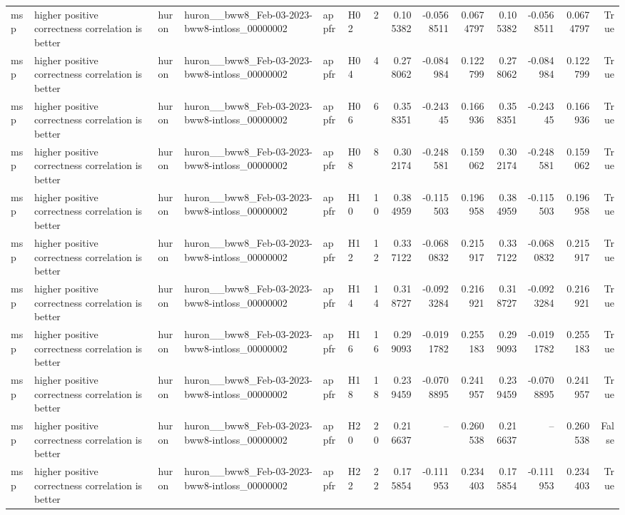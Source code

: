 \begin{longtable}{llllllrrrrrrrr}
msp & higher positive correctness correlation is better & huron & huron\_\_bww8\_Feb-03-2023-bww8-intloss\_00000002 & appfr & H02 & 2 & 0.105382 & -0.0568511 & 0.0674797 & 0.105382 & -0.0568511 & 0.0674797 & True \\
msp & higher positive correctness correlation is better & huron & huron\_\_bww8\_Feb-03-2023-bww8-intloss\_00000002 & appfr & H04 & 4 & 0.278062 & -0.084984 & 0.122799 & 0.278062 & -0.084984 & 0.122799 & True \\
msp & higher positive correctness correlation is better & huron & huron\_\_bww8\_Feb-03-2023-bww8-intloss\_00000002 & appfr & H06 & 6 & 0.358351 & -0.24345 & 0.166936 & 0.358351 & -0.24345 & 0.166936 & True \\
msp & higher positive correctness correlation is better & huron & huron\_\_bww8\_Feb-03-2023-bww8-intloss\_00000002 & appfr & H08 & 8 & 0.302174 & -0.248581 & 0.159062 & 0.302174 & -0.248581 & 0.159062 & True \\
msp & higher positive correctness correlation is better & huron & huron\_\_bww8\_Feb-03-2023-bww8-intloss\_00000002 & appfr & H10 & 10 & 0.384959 & -0.115503 & 0.196958 & 0.384959 & -0.115503 & 0.196958 & True \\
msp & higher positive correctness correlation is better & huron & huron\_\_bww8\_Feb-03-2023-bww8-intloss\_00000002 & appfr & H12 & 12 & 0.337122 & -0.0680832 & 0.215917 & 0.337122 & -0.0680832 & 0.215917 & True \\
msp & higher positive correctness correlation is better & huron & huron\_\_bww8\_Feb-03-2023-bww8-intloss\_00000002 & appfr & H14 & 14 & 0.318727 & -0.0923284 & 0.216921 & 0.318727 & -0.0923284 & 0.216921 & True \\
msp & higher positive correctness correlation is better & huron & huron\_\_bww8\_Feb-03-2023-bww8-intloss\_00000002 & appfr & H16 & 16 & 0.299093 & -0.0191782 & 0.255183 & 0.299093 & -0.0191782 & 0.255183 & True \\
msp & higher positive correctness correlation is better & huron & huron\_\_bww8\_Feb-03-2023-bww8-intloss\_00000002 & appfr & H18 & 18 & 0.239459 & -0.0708895 & 0.241957 & 0.239459 & -0.0708895 & 0.241957 & True \\
msp & higher positive correctness correlation is better & huron & huron\_\_bww8\_Feb-03-2023-bww8-intloss\_00000002 & appfr & H20 & 20 & 0.216637 & -- & 0.260538 & 0.216637 & -- & 0.260538 & False \\
msp & higher positive correctness correlation is better & huron & huron\_\_bww8\_Feb-03-2023-bww8-intloss\_00000002 & appfr & H22 & 22 & 0.175854 & -0.111953 & 0.234403 & 0.175854 & -0.111953 & 0.234403 & True \\

\end{longtable}
